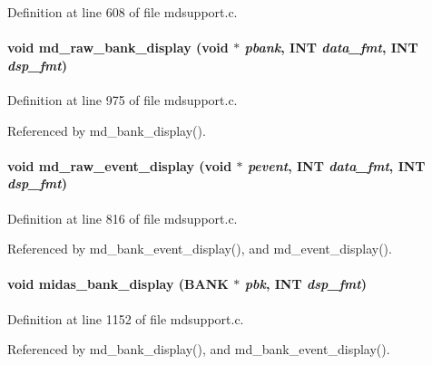Definition at line 608 of file mdsupport.c.
\paragraph[{md\_\-raw\_\-bank\_\-display}]{\setlength{\rightskip}{0pt plus 5cm}void md\_\-raw\_\-bank\_\-display (void $\ast$ {\em pbank}, \/  {\bf INT} {\em data\_\-fmt}, \/  {\bf INT} {\em dsp\_\-fmt})}\hfill\label{group__mdsupportincludecode_ga98da3c993aa60334e1c2c1244dcc86e5}


Definition at line 975 of file mdsupport.c.

Referenced by md\_\-bank\_\-display().
\paragraph[{md\_\-raw\_\-event\_\-display}]{\setlength{\rightskip}{0pt plus 5cm}void md\_\-raw\_\-event\_\-display (void $\ast$ {\em pevent}, \/  {\bf INT} {\em data\_\-fmt}, \/  {\bf INT} {\em dsp\_\-fmt})}\hfill\label{group__mdsupportincludecode_ga90a3d1ffd0ff4fdd13b9e3988ffe5277}


Definition at line 816 of file mdsupport.c.

Referenced by md\_\-bank\_\-event\_\-display(), and md\_\-event\_\-display().
\paragraph[{midas\_\-bank\_\-display}]{\setlength{\rightskip}{0pt plus 5cm}void midas\_\-bank\_\-display ({\bf BANK} $\ast$ {\em pbk}, \/  {\bf INT} {\em dsp\_\-fmt})}\hfill\label{group__mdsupportincludecode_gab099124719969f675b094e9f5618129c}


Definition at line 1152 of file mdsupport.c.

Referenced by md\_\-bank\_\-display(), and md\_\-bank\_\-event\_\-display().
